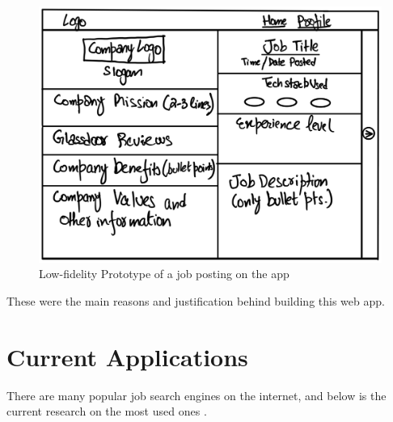 \begin{figure}
    \noindent
    \centering
    \includegraphics[width = 140mm]{Figures/lowfidelityprototype.png}
    \decoRule
    \caption[Low-Fidelity Prototype of the web app]{Low-fidelity Prototype of a job posting on the app}
    \label{fig:Low fidelity Prototype of a job posting on the app}
\end{figure}

These were the main reasons and justification behind building this web app. 

\newpage
\section{Current Applications}
There are many popular job search engines on the internet, and below is the current research on the most used ones \parencite{Reference1}.

